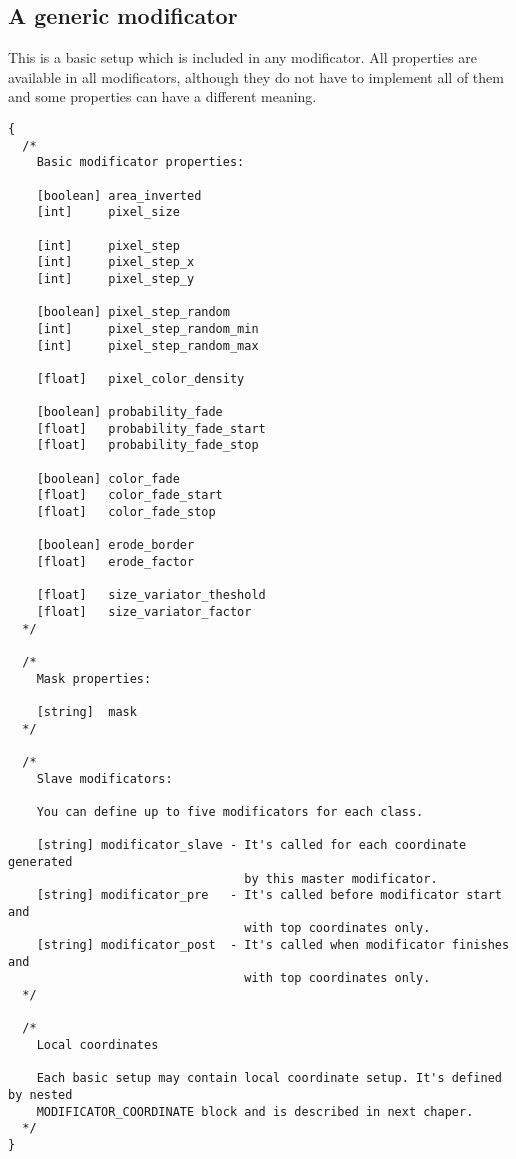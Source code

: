 \documentclass[11pt]{article}
\begin{document}
\subsection{A generic modificator}

This is a basic setup which is included in any modificator.
All properties are available in all modificators, 
although they do not have to implement all of them 
and some properties can have a different meaning.

\begin{verbatim}
{
  /*
    Basic modificator properties:
  
    [boolean] area_inverted
    [int]     pixel_size
    
    [int]     pixel_step
    [int]     pixel_step_x
    [int]     pixel_step_y
  
    [boolean] pixel_step_random
    [int]     pixel_step_random_min
    [int]     pixel_step_random_max
    
    [float]   pixel_color_density
    
    [boolean] probability_fade
    [float]   probability_fade_start
    [float]   probability_fade_stop
  
    [boolean] color_fade
    [float]   color_fade_start
    [float]   color_fade_stop
      
    [boolean] erode_border
    [float]   erode_factor
    
    [float]   size_variator_theshold
    [float]   size_variator_factor
  */    
    
  /*
    Mask properties:
    
    [string]  mask
  */
    
  /*
    Slave modificators:
    
    You can define up to five modificators for each class.
    
    [string] modificator_slave - It's called for each coordinate generated
                                 by this master modificator.    
    [string] modificator_pre   - It's called before modificator start and
                                 with top coordinates only.
    [string] modificator_post  - It's called when modificator finishes and
                                 with top coordinates only.
  */  

  /*
    Local coordinates
    
    Each basic setup may contain local coordinate setup. It's defined by nested 
    MODIFICATOR_COORDINATE block and is described in next chaper.
  */
}
\end{verbatim}
\end{document}
